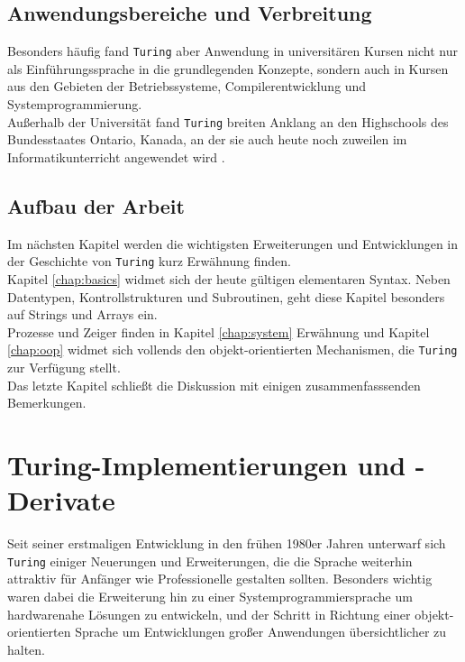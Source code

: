 \subsection{Anwendungsbereiche und Verbreitung}

Besonders h\"aufig fand \texttt{Turing} aber Anwendung in universit\"aren Kursen nicht nur als Einf\"uhrungssprache in die grundlegenden Konzepte, sondern auch in Kursen aus den Gebieten der Betriebssysteme, Compilerentwicklung und Systemprogrammierung. \\
Au\ss{}erhalb der Universit\"at fand \texttt{Turing} breiten Anklang an den Highschools des Bundesstaates Ontario, Kanada, an der sie auch heute noch zuweilen im Informatikunterricht angewendet wird \cite{Holt:88}. 

\subsection{Aufbau der Arbeit}

Im n\"achsten Kapitel werden die wichtigsten Erweiterungen und Entwicklungen in der Geschichte von \texttt{Turing} kurz Erw\"ahnung finden. \\
Kapitel \ref{chap:basics} widmet sich der heute g\"ultigen elementaren Syntax. Neben Datentypen, Kontrollstrukturen und Subroutinen, geht diese Kapitel besonders auf Strings und Arrays ein. \\
Prozesse und Zeiger finden in Kapitel \ref{chap:system} Erw\"ahnung und Kapitel \ref{chap:oop} widmet sich vollends den objekt-orientierten Mechanismen, die \texttt{Turing} zur Verf\"ugung stellt. \\
Das letzte Kapitel schlie\ss{}t die Diskussion mit einigen zusammenfasssenden Bemerkungen.


\section{Turing-Implementierungen und -Derivate}
\label{chap:imp}

Seit seiner erstmaligen Entwicklung in den fr\"uhen 1980er Jahren unterwarf sich \texttt{Turing} einiger Neuerungen und Erweiterungen, die die Sprache weiterhin attraktiv f\"ur Anf\"anger wie Professionelle gestalten sollten. Besonders wichtig waren dabei die Erweiterung hin zu einer Systemprogrammiersprache um hardwarenahe L\"osungen zu entwickeln, und der Schritt in Richtung einer objekt-orientierten Sprache um Entwicklungen gro\ss{}er Anwendungen \"ubersichtlicher zu halten. \\

